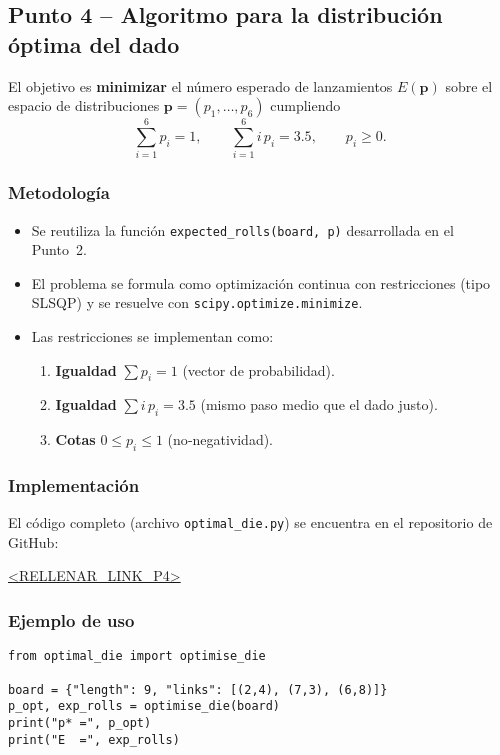 \subsection{Punto 4 – Algoritmo para la distribución óptima del dado}

El objetivo es \textbf{minimizar} el número esperado de lanzamientos
$E(\mathbf{p})$ sobre el espacio de distribuciones
$\mathbf{p} = (p_1,\dots,p_6)$ cumpliendo
\[
\sum_{i=1}^6 p_i = 1,
\qquad
\sum_{i=1}^6 i\,p_i = 3.5,
\qquad
p_i \ge 0.
\]

\subsubsection{Metodología}
\begin{itemize}
  \item Se reutiliza la función \verb|expected_rolls(board, p)| desarrollada en el Punto~2.
  \item El problema se formula como optimización continua con restricciones
        (tipo SLSQP) y se resuelve con \texttt{scipy.optimize.minimize}.
  \item Las restricciones se implementan como:
        \begin{enumerate}
          \item \textbf{Igualdad} $\sum p_i = 1$ (vector de probabilidad).
          \item \textbf{Igualdad} $\sum i\,p_i = 3.5$ (mismo paso medio que el dado justo).
          \item \textbf{Cotas} $0 \le p_i \le 1$ (no‐negatividad).
        \end{enumerate}
\end{itemize}

\subsubsection{Implementación}
El código completo (archivo \texttt{optimal\_die.py}) se encuentra en el
repositorio de GitHub:

\begin{center}
\url{<RELLENAR_LINK_P4>}
\end{center}

\subsubsection{Ejemplo de uso}
\begin{verbatim}
from optimal_die import optimise_die

board = {"length": 9, "links": [(2,4), (7,3), (6,8)]}
p_opt, exp_rolls = optimise_die(board)
print("p* =", p_opt)
print("E  =", exp_rolls)
\end{verbatim}

